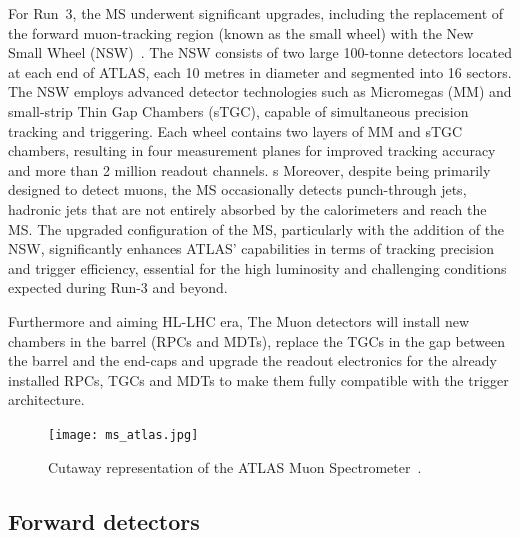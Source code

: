 For Run~3, the MS underwent significant upgrades, including the replacement of the forward muon-tracking region (known as the small wheel) with the New Small Wheel (NSW)~\cite{nsw_tech}. The NSW consists of two large 100-tonne detectors located at each end of ATLAS, each 10 metres in diameter and segmented into 16 sectors. The NSW employs advanced detector technologies such as Micromegas (MM) and small-strip Thin Gap Chambers (sTGC), capable of simultaneous precision tracking and triggering. Each wheel contains two layers of MM and sTGC chambers, resulting in four measurement planes for improved tracking accuracy and more than 2 million readout channels.
s
Moreover, despite being primarily designed to detect muons, the MS occasionally detects punch-through jets, hadronic jets that are not entirely absorbed by the calorimeters and reach the MS. The upgraded configuration of the MS, particularly with the addition of the NSW, significantly enhances ATLAS' capabilities in terms of tracking precision and trigger efficiency, essential for the high luminosity and challenging conditions expected during Run-3 and beyond.

Furthermore and aiming HL-LHC era, The Muon detectors will install new chambers in the barrel (RPCs and MDTs), replace the TGCs in the gap between the barrel and the end-caps and upgrade the readout electronics for the already installed RPCs, TGCs and MDTs to make them fully compatible with the trigger architecture.

\begin{figure}[htbp]
    \centering
        \texttt{[image: ms\_atlas.jpg]}
    \caption{Cutaway representation of the ATLAS Muon Spectrometer~\cite{Bianchi:2837191}.}
    \label{fig:ms_atlas}
\end{figure}

\subsection{Forward detectors}
\label{sec:fwd}

